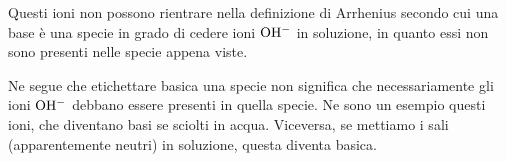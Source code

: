 Questi ioni non possono rientrare nella definizione di Arrhenius secondo cui una base è una specie in grado di cedere ioni $\rm OH^-$ in soluzione, in quanto essi non sono presenti nelle specie appena viste.

Ne segue che etichettare basica una specie non significa che necessariamente gli ioni $\rm OH^-$ debbano essere presenti in quella specie. Ne sono un esempio questi ioni, che diventano basi se sciolti in acqua. Viceversa, se mettiamo i sali (apparentemente neutri) in soluzione, questa diventa basica.